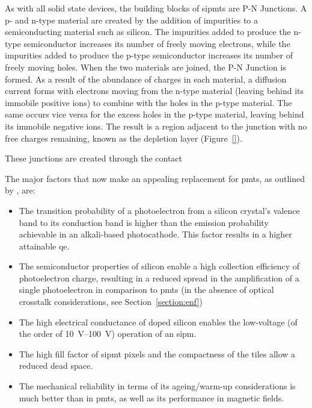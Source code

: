 As with all solid state devices, the building blocks of \glspl{sipmt} are P-N Junctions. A p- and n-type material are created by the addition of impurities to a semiconducting material such as silicon. The impurities added to produce the n-type semiconductor increases its number of freely moving electrons, while the impurities added to produce the p-type semiconductor increases its number of freely moving holes. When the two materials are joined, the P-N Junction is formed. As a result of the abundance of charges in each material, a diffusion current forms with electrons moving from the n-type material (leaving behind its immobile positive ions) to combine with the holes in the p-type material. The same occurs vice versa for the excess holes in the p-type material, leaving behind its immobile negative ions. The result is a region adjacent to the junction with no free charges remaining, known as the depletion layer (Figure~\ref{}). 

These junctions are created through the contact

The major factors that now make  an appealing replacement for \glspl{pmt}, as outlined by \textcite{Ghassemi2017}, are:
\begin{itemize}
\item The transition probability of a photoelectron from a silicon crystal’s valence band to its conduction band is higher than the emission probability achievable in an alkali-based photocathode. This factor results in a higher attainable \gls{qe}. 
\item The semiconductor properties of silicon enable a high collection efficiency of photoelectron charge, resulting in a reduced spread in the amplification of a single photoelectron in comparison to \glspl{pmt} (in the absence of optical crosstalk considerations, see Section~\ref{section:enf})
\item The high electrical conductance of doped silicon enables the low-voltage (of the order of \SIrange{10}{100}{V}) operation of an \gls{sipm}.
\item The high fill factor of \gls{sipmt} pixels and the compactness of the tiles allow a reduced dead space.
\item The mechanical reliability in terms of its ageing/warm-up considerations is much better than in \glspl{pmt}, as well as its performance in magnetic fields.
\end{itemize}





